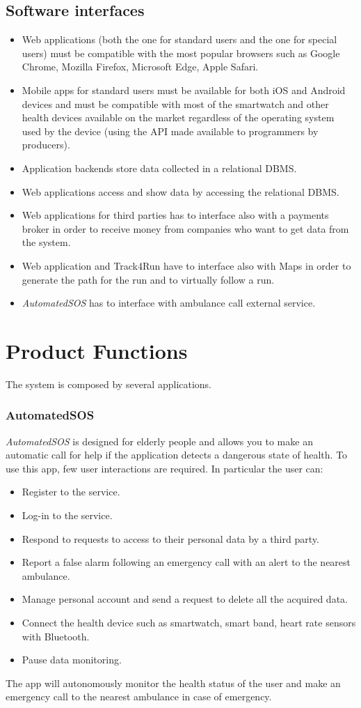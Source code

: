 \subsection{Software interfaces}
\begin{itemize}
\item Web applications (both the one for standard users and the one for special users) must be compatible with the most popular browsers such as Google Chrome, Mozilla Firefox, Microsoft Edge, Apple Safari.
\item	Mobile apps for standard users must be available for both iOS and Android devices and must be compatible with most of the smartwatch and other health devices available on the market regardless of the operating system used by the device (using the API made available to programmers by producers).
\item	Application backends store data collected in a relational DBMS.
\item	 Web applications access and show data by accessing the relational DBMS.
\item	 Web applications for third parties has to interface also with a payments broker in order to receive money from companies who want to get data from the system.
\item Web application and Track4Run have to interface also with Maps in order to generate the path for the run and to virtually follow a run.
\item \textit{AutomatedSOS} has to interface with ambulance call external service.
\end{itemize}

\section{Product Functions}
The system is composed by several applications.
\subsubsection{AutomatedSOS}
\textit{AutomatedSOS} is designed for elderly people and allows you to make an automatic call for help if the application detects a dangerous state of health.
To use this app, few user interactions are required.
In particular the user can:
\begin{itemize}
\item Register to the service.
\item Log-in to the service.
\item Respond to requests to access to their personal data by a third party.
\item Report a false alarm following an emergency call with an alert to the nearest ambulance.
\item Manage personal account and send a request to delete all the acquired data.
\item Connect the health device such as smartwatch, smart band, heart rate sensors with Bluetooth.
\item Pause data monitoring.
\end{itemize}
The app will autonomously monitor the health status of the user and make an emergency call to the nearest ambulance in case of emergency.

